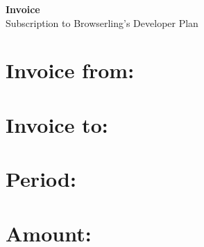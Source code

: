 \documentclass[12pt]{article}
\begin{document}
\begin{center}
\Large{\textbf{Invoice}} \\
\vspace{0.5cm}
\large{Subscription to Browserling's Developer Plan}
\end{center}

\vspace{1cm}

\section*{Invoice from:}

\section*{Invoice to:}

\section*{Period:}

\section*{Amount:}
\end{document}
